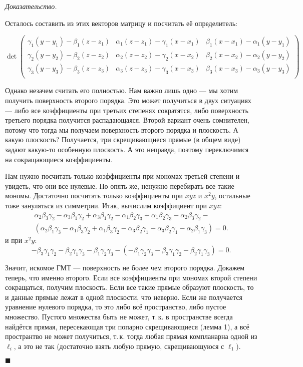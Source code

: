 \documentclass[a4paper, 12pt]{article}
\renewenvironment{proof}{
    \smallskip\noindent\textit{Доказательство.}
}{
    \hfill$\blacksquare$\par\smallskip
}
\begin{document}
\begin{proof}
    Осталось составить из этих векторов матрицу и посчитать её определитель:

    $$
    \det
    \begin{pmatrix}
        \gamma_1(y - y_1) - \beta_1(z - z_1) & \alpha_1(z - z_1) - \gamma_1(x - x_1) & \beta_1(x - x_1) - \alpha_1(y - y_1)\\
        \gamma_2(y - y_2) - \beta_2(z - z_2) & \alpha_2(z - z_2) - \gamma_2(x - x_2) & \beta_2(x - x_2) - \alpha_2(y - y_2)\\
        \gamma_3(y - y_3) - \beta_3(z - z_3) & \alpha_3(z - z_3) - \gamma_3(x - x_3) & \beta_3(x - x_3) - \alpha_3(y - y_3)\\
    \end{pmatrix}
    $$

    Однако незачем считать его полностью. Нам важно лишь одно --- мы хотим получить поверхность второго порядка. Это может получиться в двух ситуациях --- либо все коэффициенты при третьих степенях сократятся, либо поверхность третьего порядка получится распадающаяся. Второй вариант очень сомнителен, потому что тогда мы получаем поверхность второго порядка и плоскость. А какую плоскость? Получается, три скрещивающиеся прямые (в общем виде) задают какую-то особенную плоскость. А это неправда, поэтому переключимся на сокращающиеся коэффициенты.

    Нам нужно посчитать только коэффициенты при мономах третьей степени и увидеть, что они все нулевые. Но опять же, ненужно перебирать все такие мономы. Достаточно посчитать только коэффициенты при $xyz$ и $x^2y$, остальные тоже зануляться из симметрии. Итак, вычислим коэффициент при $xyz$:
    $$
    \begin{array}{c}\displaystyle
        \alpha_2\beta_3\gamma_2 - \alpha_3\beta_1\gamma_2 + \alpha_3\beta_1\gamma_2 - \alpha_1\beta_2\gamma_3 + \alpha_1\beta_2\gamma_3 - \alpha_2\beta_3\gamma_2 - {}\\\displaystyle (\alpha_2\beta_1\gamma_3 - \alpha_1\beta_3\gamma_2 + \alpha_1\beta_3\gamma_2 - \alpha_3\beta_2\gamma_1 + \alpha_3\beta_2\gamma_1 - \alpha_2\beta_1\gamma_3) = 0.
    \end{array}
    $$
    и при $x^2y$:
    $$
    -\beta_3\gamma_1\gamma_2 - \beta_2\gamma_1\gamma_3 - \beta_1\gamma_2\gamma_3 - (-\beta_1\gamma_2\gamma_3 - \beta_3\gamma_1\gamma_2 - \beta_2\gamma_1\gamma_3) = 0.
    $$

    Значит, искомое ГМТ --- поверхность не более чем второго порядка. Докажем теперь, что именно второго. Если все коэффициенты при мономах второй степени сокращаться, получим плоскость. Если все такие прямые образуют плоскость, то и данные прямые лежат в одной плоскости, что неверно. Если же получается уравнение нулевого порядка, то это либо всё пространство, либо пустое множество. Пустого множества быть не может, т.\,к. в пространстве всегда найдётся прямая, пересекающая три попарно скрещивающиеся (лемма 1), а всё пространтво не может получиться, т.\,к. тогда любая прямая компланарна одной из $\ell_i$, а это не так (достаточно взять любую прямую, скрещивающуюся с $\ell_1$).
\end{proof}
\end{document}
